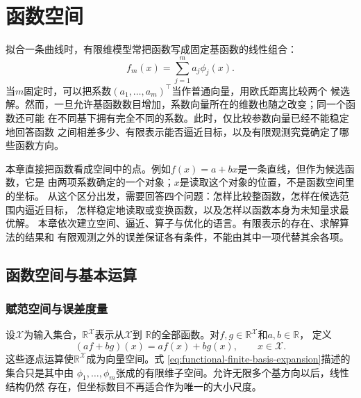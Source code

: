 \chapter{函数空间}
\label{chap:functional-analysis-and-approximation}

\newcommand{\functionalinlinetablecaption}[2]{%
  \refstepcounter{table}\label{#1}%
  \addcontentsline{lot}{table}{\protect\numberline{\thetable}#2}%
  \par\smallskip\noindent
  {\figurefont\footnotesize
   \textcolor{BookTeal}{表~\thetable}\quad #2}\par}
\newcommand{\functionalinlinefigurecaption}[2]{%
  \refstepcounter{figure}\label{#1}%
  \addcontentsline{lof}{figure}{\protect\numberline{\thefigure}#2}%
  \par\smallskip\noindent
  {\figurefont\footnotesize
   \textcolor{BookTeal}{图~\thefigure}\quad #2}\par}

拟合一条曲线时，有限维模型常把函数写成固定基函数的线性组合：
\begin{equation}
  f_m(x)=\sum_{j=1}^{m}a_j\phi_j(x).
  \label{eq:functional-finite-basis-expansion}
\end{equation}
当$m$固定时，可以把系数$(a_1,\ldots,a_m)^{\top}$当作普通向量，用欧氏距离比较两个
候选解。然而，一旦允许基函数数目增加，系数向量所在的维数也随之改变；同一个函数还可能
在不同基下拥有完全不同的系数。此时，仅比较参数向量已经不能稳定地回答函数
之间相差多少、有限表示能否逼近目标，以及有限观测究竟确定了哪些函数方向。

本章直接把函数看成空间中的点。例如$f(x)=a+bx$是一条直线，但作为候选函数，它是
由两项系数确定的一个对象；$x$是读取这个对象的位置，不是函数空间里的坐标。
从这个区分出发，需要回答四个问题：怎样比较整函数，怎样在候选范围内逼近目标，
怎样稳定地读取或变换函数，以及怎样以函数本身为未知量求最优解。
本章依次建立空间、逼近、算子与优化的语言。有限表示的存在、求解算法的结果和
有限观测之外的误差保证各有条件，不能由其中一项代替其余各项。

\section{函数空间与基本运算}
\label{sec:functional-functions-as-space-elements}

\subsection{赋范空间与误差度量}

设$\mathcal{X}$为输入集合，$\mathbb{R}^{\mathcal{X}}$表示从$\mathcal{X}$到
$\mathbb{R}$的全部函数。对$f,g\in\mathbb{R}^{\mathcal{X}}$和$a,b\in\mathbb{R}$，
定义
\[
  (af+bg)(x)=af(x)+bg(x),\qquad x\in\mathcal{X}.
\]
这些逐点运算使$\mathbb{R}^{\mathcal{X}}$成为向量空间。式
\eqref{eq:functional-finite-basis-expansion}描述的集合只是其中由
$\phi_1,\ldots,\phi_m$张成的有限维子空间。允许无限多个基方向以后，线性结构仍然
存在，但坐标数目不再适合作为唯一的大小尺度。


